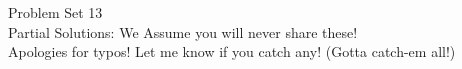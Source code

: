 \documentclass[12pt]{memoir}
\begin{document}
\newcommand{\detritus}[1]{}





\thispagestyle{empty}


\begin{center}
\Large Problem Set 13 \\[1ex] 
\large Partial Solutions: We Assume you will never share these! \\[3ex] 
\normalsize Apologies for typos! Let me know if you catch any! (Gotta catch-em all!)
\end{center}
\end{document}
